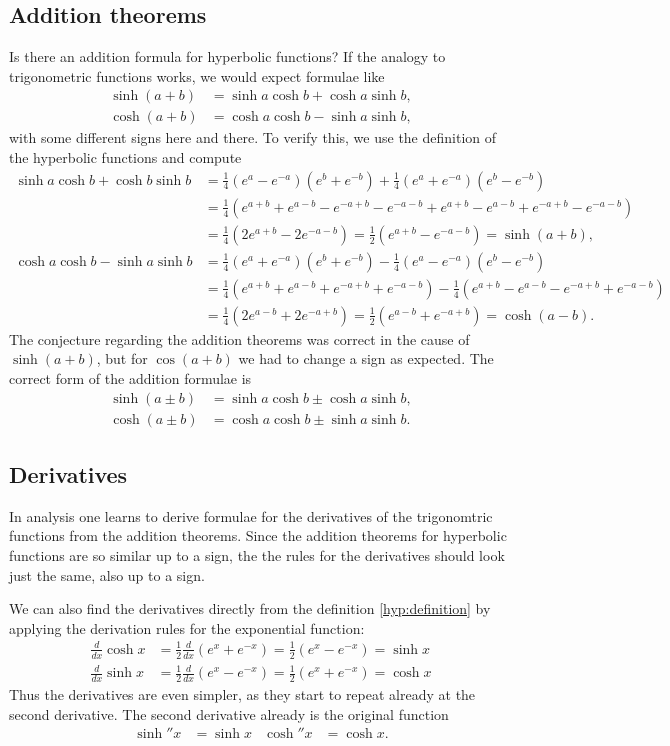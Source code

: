 \subsection{Addition theorems}
Is there an addition formula for hyperbolic functions?
If the analogy to trigonometric functions works, we would expect 
formulae like
\begin{align*}
\sinh(a+b)&=\sinh a\cosh b + \cosh a\sinh b,\\
\cosh(a+b)&=\cosh a\cosh b - \sinh a\sinh b,
\end{align*}
with some different signs here and there.
To verify this, we use the definition of the hyperbolic functions and compute
\begin{align*}
\sinh a\cosh b + \cosh b\sinh b
&=
\frac14(e^a-e^{-a})(e^b+e^{-b})
+
\frac14(e^a+e^{-a})(e^b-e^{-b})
\\
&=\frac14(e^{a+b}+e^{a-b}-e^{-a+b}-e^{-a-b} + e^{a+b}-e^{a-b}+e^{-a+b}-e^{-a-b})
\\
&=
\frac14(2e^{a+b}-2e^{-a-b})
=
\frac12(e^{a+b}-e^{-a-b})=\sinh(a+b),
\\
\cosh a\cosh b-\sinh a\sinh b
&=
\frac14(e^a+e^{-a})(e^b+e^{-b})
-
\frac14(e^a-e^{-a})(e^b-e^{-b})
\\
&=
\frac14(e^{a+b}+e^{a-b}+e^{-a+b}+e^{-a-b})
-
\frac14(e^{a+b}-e^{a-b}-e^{-a+b}+e^{-a-b})
\\
&=
\frac14(2e^{a-b}+2e^{-a+b})
=
\frac12(e^{a-b}+e^{-a+b})=\cosh(a-b).
\end{align*}
The conjecture regarding the addition theorems was correct in the cause
of $\sinh(a+b)$, but for $\cos(a+b)$ we had to change a sign as expected.
The correct form of the addition formulae is
\begin{align*}
\sinh(a\pm b)&=\sinh a\cosh b \pm \cosh a\sinh b,\\
\cosh(a\pm b)&=\cosh a\cosh b \pm \sinh a\sinh b.
\end{align*}

\subsection{Derivatives}
In analysis one learns to derive formulae for the derivatives of the
trigonomtric functions from the addition theorems.
Since the addition theorems for hyperbolic functions are so similar
up to a sign, the the rules for the derivatives should look just the
same, also up to a sign.

We can also find the derivatives directly from the definition
\eqref{hyp:definition} by applying the derivation rules for the
exponential function:
\begin{align*}
\frac{d}{dx}\cosh x
&=
\frac12\frac{d}{dx}(e^x+e^{-x})
=
\frac12(e^x-e^{-x})=\sinh x
\\
\frac{d}{dx}\sinh x
&=
\frac12\frac{d}{dx}(e^x-e^{-x})
=
\frac12(e^x+e^{-x})=\cosh x
\end{align*}
Thus the derivatives are even simpler, as they start to repeat already
at the second derivative.
The second derivative already is the original function
\begin{align*}
\sinh''x&=\sinh x
&
\cosh''x&=\cosh x.
\end{align*}

